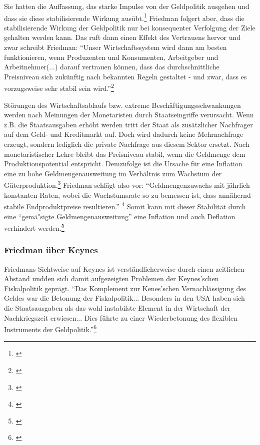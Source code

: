 \documentclass[
        onecolumn,
        a4paper,
        abstracton,
        parskip=half
        ,final
        ]{scrartcl}
\begin{document}
Sie hatten die Auffassung, das starke Impulse von der Geldpolitik ausgehen und
dass sie diese stabilisierende Wirkung aus{\"u}bt.\footnote[502]{\citep[S.181]{bombach1981theorie}}
 Friedman folgert aber, dass die stabilisierende Wirkung der Geldpolitik nur bei konsequenter Verfolgung
der Ziele gehalten werden kann. Das ruft dann einen Effekt des Vertrauens
hervor und zwar schreibt Friedman: "`Unser Wirtschaftssystem wird dann am
besten funktionieren, wenn Produzenten und Konsumenten, Arbeitgeber und
Arbeitnehmer(...) darauf vertrauen k{\"o}nnen, dass das durchschnittliche
Preisniveau sich zuk{\"u}nftig nach bekannten Regeln gestaltet - und zwar, dass
es vorzugsweise sehr stabil sein wird."'\footnote[503]{\citep[vgl.][S.150]{friedman1970die}}

St{\"o}rungen des Wirtschaftsablaufs bzw. extreme Besch{\"a}ftigungsschwankungen
werden nach Meinungen der Monetaristen durch Staatseingriffe verursacht. Wenn
z.B. die Staatsausgaben erh{\"o}ht werden tritt der Staat als zus{\"a}tzlicher
Nachfrager auf dem Geld- und Kreditmarkt auf. Doch wird dadurch keine
Mehrnachfrage erzeugt, sondern lediglich die private Nachfrage aus diesem
Sektor ersetzt. Nach monetaristischer Lehre bleibt das Preisniveau stabil,
wenn die Geldmenge dem Produktionspotential entspricht. Demzufolge ist die
Ursache f{\"u}r eine Inflation eine zu hohe Geldmengenausweitung im Verh{\"a}ltnis zum
Wachstum der G{\"u}terproduktion.\footnote[504]{\citep[Vgl.][S.213]{peters2000}}
Friedman schl{\"a}gt also vor: "`Geldmengenzuwachs mit j{\"a}hrlich konstanten Raten, wobei die Wachstumsrate so zu bemessen ist, dass ann{\"a}hernd stabile Endproduktpreise resultieren."' \footnote[505]{\citep[vgl.][S.132]{friedman1970die}} Somit kann mit dieser
Stabilit{\"a}t durch eine "`gem{\"a}{"s}igte Geldmengenausweitung"' eine Inflation und auch
Deflation verhindert werden.\footnote[506]{\citep[vgl.][S.155]{friedman1970die}}





\subsubsection{Friedman {\"u}ber Keynes}
Friedmans Sichtweise auf Keynes ist verst{\"a}ndlicherweise durch einen zeitlichen Abstand undden sich damit aufgezeigten Problemen der Keynes'schen Fiskalpolitik gepr{\"a}gt.  "`Das Komplement zur Kenes'schen Vernachl{\"a}ssigung des Geldes war die Betonung der
Fiskalpolitik... Besonders in den USA haben sich die Staatsausgaben als das wohl instabilste Element in der Wirtschaft der Nachkriegszeit erwiesen... Dies f{\"u}hrte zu einer Wiederbetonung des flexiblen Instruments der Geldpolitik."'\footnote[801]{\citep[S.105]{friedman1970die}}
\end{document}
